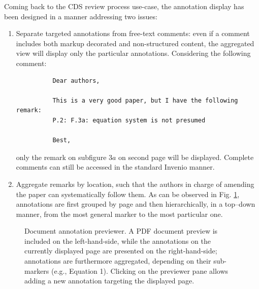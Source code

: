 Coming back to the CDS review process use-case, the annotation display has been
designed in a manner addressing two issues:
\begin{enumerate}
  \item Separate targeted annotations from free-text comments: even if a comment
        includes both markup decorated and non-structured content, the
        aggregated view will display only the particular annotations.
        Considering the following comment:
        \begin{verbatim}
          Dear authors,

          This is a very good paper, but I have the following remark:
          P.2: F.3a: equation system is not presumed

          Best,
        \end{verbatim}
        only the remark on subfigure $3a$ on second page will be displayed.
        Complete comments can still be accessed in the standard Invenio
        manner.
  \item Aggregate remarks by location, such that the authors in charge of
        amending the paper can systematically follow them. As can be observed in
        Fig. \ref{fig:noteview}, annotations are first grouped by page and then
        hierarchically, in a top--down manner, from the most general marker to
        the most particular one.
\end{enumerate}

\begin{figure}[!ht]
  \centering
  \caption[Document annotation previewer]
          {Document annotation previewer. A PDF document preview is included on
           the left-hand-side, while the annotations on the currently displayed
           page are presented on the right-hand-side; annotations are
           furthermore aggregated, depending on their sub-markers (e.g.,
           Equation 1). Clicking on the previewer pane allows adding a new
           annotation targeting the displayed page.}
  \label{fig:noteview}
\end{figure}

